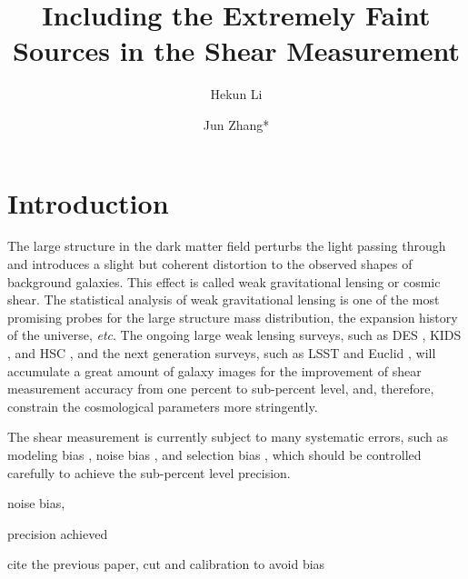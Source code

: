 \documentclass[twocolumn]{aastex62}
\def\etc{{\it etc}}
\begin{document}
\title{Including the Extremely Faint Sources in the Shear Measurement}



\author{Hekun Li}
\author{Jun Zhang*}


\begin{abstract}



\end{abstract}




\section{Introduction} \label{sec:intro}

The large structure in the dark matter field perturbs the light passing through and introduces a slight but coherent distortion to the observed shapes of background galaxies. This effect is called weak gravitational lensing or cosmic shear. The statistical analysis of weak gravitational lensing is one of the most promising probes for the large structure mass distribution, the expansion history of the universe, \etc\citep{Bartelmann2001, Hoekastra2008,Kilbringer2015}. The ongoing large weak lensing surveys, such as DES \citep{Troxel2018}, KIDS \citep{Hildebrandt2016}, and HSC \citep{Hikage2019}, and the next generation surveys, such as LSST \citep{Abell2009} and Euclid \citep{Laureijs2011}, will accumulate a great amount of galaxy images for the improvement of shear measurement accuracy from one percent to sub-percent level, and, therefore, constrain the cosmological parameters more stringently. 

The shear measurement is currently subject to many systematic errors, such as modeling bias \citep{Bernstein2010,Voigt2010,Kacprzak2014}, noise bias \citep{Refregier2012,Kacprzak2014}, and selection bias \citep{Hirata2003}, which should be controlled carefully to achieve the sub-percent level precision. 

noise bias, 

precision achieved

cite the previous paper, cut and calibration to avoid bias
\end{document}
